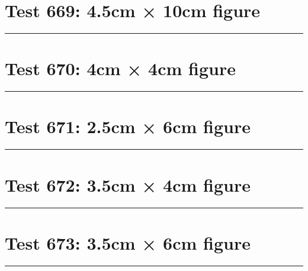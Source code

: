 \documentclass[a4paper,11pt]{article}
\begin{document}
\section*{Test 669: 4.5cm × 10cm figure}
\begin{swarmwrap}%
  \begin{minipage}[t]{4cm}
    \centering
    \rule{\linewidth}{10cm}
  \end{minipage}%
\end{swarmwrap}%
\swarmwrapnext
\lipsum[148]
\lipsum[149]
\lipsum[150]
\lipsum[1]
\section*{Test 670: 4cm × 4cm figure}
\begin{swarmwrap}%
  \begin{minipage}[t]{4cm}
    \centering
    \rule{\linewidth}{4cm}
  \end{minipage}%
\end{swarmwrap}%
\swarmwrapnext
\lipsum[45]
\lipsum[46]
\lipsum[47]
\lipsum[48]
\lipsum[49]
\lipsum[50]
\section*{Test 671: 2.5cm × 6cm figure}
\begin{swarmwrap}%
  \begin{minipage}[t]{2cm}
    \centering
    \rule{\linewidth}{6cm}
  \end{minipage}%
\end{swarmwrap}%
\swarmwrapnext
\lipsum[70]
\lipsum[71]
\lipsum[72]
\lipsum[73]
\lipsum[74]
\section*{Test 672: 3.5cm × 4cm figure}
\begin{swarmwrap}%
  \begin{minipage}[t]{3cm}
    \centering
    \rule{\linewidth}{4cm}
  \end{minipage}%
\end{swarmwrap}%
\swarmwrapnext
\lipsum[44]
\lipsum[45]
\lipsum[46]
\section*{Test 673: 3.5cm × 6cm figure}
\begin{swarmwrap}%
  \begin{minipage}[t]{3cm}
    \centering
    \rule{\linewidth}{6cm}
  \end{minipage}%
\end{swarmwrap}%
\swarmwrapnext
\lipsum[78]
\lipsum[79]
\lipsum[80]
\lipsum[81]
\lipsum[82]
\lipsum[83]
\end{document}
